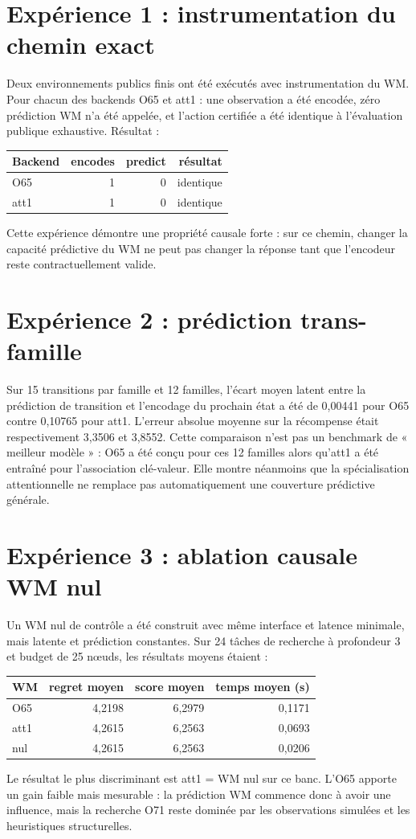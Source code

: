 \documentclass[11pt,a4paper]{article}
\begin{document}
\section{Expérience 1 : instrumentation du chemin exact}
Deux environnements publics finis ont été exécutés avec instrumentation du WM. Pour chacun des backends O65 et att1 : une observation a été encodée, zéro prédiction WM n'a été appelée, et l'action certifiée a été identique à l'évaluation publique exhaustive. Résultat :
\begin{center}\begin{tabular}{lrrr} \toprule Backend & encodes & predict & résultat \\ \midrule O65 & 1 & 0 & identique \\ att1 & 1 & 0 & identique \\ \bottomrule\end{tabular}\end{center}
Cette expérience démontre une propriété causale forte : sur ce chemin, changer la capacité prédictive du WM ne peut pas changer la réponse tant que l'encodeur reste contractuellement valide.
\section{Expérience 2 : prédiction trans-famille}
Sur 15 transitions par famille et 12 familles, l'écart moyen latent entre la prédiction de transition et l'encodage du prochain état a été de 0,00441 pour O65 contre 0,10765 pour att1. L'erreur absolue moyenne sur la récompense était respectivement 3,3506 et 3,8552. Cette comparaison n'est pas un benchmark de « meilleur modèle » : O65 a été conçu pour ces 12 familles alors qu'att1 a été entraîné pour l'association clé-valeur. Elle montre néanmoins que la spécialisation attentionnelle ne remplace pas automatiquement une couverture prédictive générale.
\section{Expérience 3 : ablation causale WM nul}
Un WM nul de contrôle a été construit avec même interface et latence minimale, mais latente et prédiction constantes. Sur 24 tâches de recherche à profondeur 3 et budget de 25 nœuds, les résultats moyens étaient :
\begin{center}\begin{tabular}{lrrr} \toprule WM & regret moyen & score moyen & temps moyen (s) \\ \midrule O65 & 4,2198 & 6,2979 & 0,1171 \\ att1 & 4,2615 & 6,2563 & 0,0693 \\ nul & 4,2615 & 6,2563 & 0,0206 \\ \bottomrule\end{tabular}\end{center}
Le résultat le plus discriminant est att1 = WM nul sur ce banc. L'O65 apporte un gain faible mais mesurable : la prédiction WM commence donc à avoir une influence, mais la recherche O71 reste dominée par les observations simulées et les heuristiques structurelles.
\end{document}
